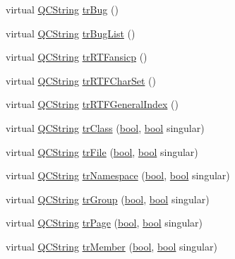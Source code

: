 \begin{DoxyCompactItemize}
\item 
virtual \hyperlink{class_q_c_string}{Q\+C\+String} \hyperlink{class_translator_arabic_aacd74b628e36340a3b593435bc295529}{tr\+Bug} ()
\item 
virtual \hyperlink{class_q_c_string}{Q\+C\+String} \hyperlink{class_translator_arabic_a1a0f397c655873ff36805aef2a2f4282}{tr\+Bug\+List} ()
\item 
virtual \hyperlink{class_q_c_string}{Q\+C\+String} \hyperlink{class_translator_arabic_aa85b5114f22f96945211a76b143bc067}{tr\+R\+T\+Fansicp} ()
\item 
virtual \hyperlink{class_q_c_string}{Q\+C\+String} \hyperlink{class_translator_arabic_a2d31627bc9d5ab47da2d88e210a17b32}{tr\+R\+T\+F\+Char\+Set} ()
\item 
virtual \hyperlink{class_q_c_string}{Q\+C\+String} \hyperlink{class_translator_arabic_ab7697710fd8381e9b2439afb69fb1894}{tr\+R\+T\+F\+General\+Index} ()
\item 
virtual \hyperlink{class_q_c_string}{Q\+C\+String} \hyperlink{class_translator_arabic_af60f81882a17979949235c2b0ddf0691}{tr\+Class} (\hyperlink{qglobal_8h_a1062901a7428fdd9c7f180f5e01ea056}{bool}, \hyperlink{qglobal_8h_a1062901a7428fdd9c7f180f5e01ea056}{bool} singular)
\item 
virtual \hyperlink{class_q_c_string}{Q\+C\+String} \hyperlink{class_translator_arabic_aca6144fb44b8cfcf13db8c5bc91a4557}{tr\+File} (\hyperlink{qglobal_8h_a1062901a7428fdd9c7f180f5e01ea056}{bool}, \hyperlink{qglobal_8h_a1062901a7428fdd9c7f180f5e01ea056}{bool} singular)
\item 
virtual \hyperlink{class_q_c_string}{Q\+C\+String} \hyperlink{class_translator_arabic_a1f3b25edf7d4e0bb62949b2c23bf6bbe}{tr\+Namespace} (\hyperlink{qglobal_8h_a1062901a7428fdd9c7f180f5e01ea056}{bool}, \hyperlink{qglobal_8h_a1062901a7428fdd9c7f180f5e01ea056}{bool} singular)
\item 
virtual \hyperlink{class_q_c_string}{Q\+C\+String} \hyperlink{class_translator_arabic_a0e846c5779242ca184c0eba9e939be4c}{tr\+Group} (\hyperlink{qglobal_8h_a1062901a7428fdd9c7f180f5e01ea056}{bool}, \hyperlink{qglobal_8h_a1062901a7428fdd9c7f180f5e01ea056}{bool} singular)
\item 
virtual \hyperlink{class_q_c_string}{Q\+C\+String} \hyperlink{class_translator_arabic_a01335b7b68d621778e021feffe7ad1cc}{tr\+Page} (\hyperlink{qglobal_8h_a1062901a7428fdd9c7f180f5e01ea056}{bool}, \hyperlink{qglobal_8h_a1062901a7428fdd9c7f180f5e01ea056}{bool} singular)
\item 
virtual \hyperlink{class_q_c_string}{Q\+C\+String} \hyperlink{class_translator_arabic_a079b9fecf2ac416addd85d6498290628}{tr\+Member} (\hyperlink{qglobal_8h_a1062901a7428fdd9c7f180f5e01ea056}{bool}, \hyperlink{qglobal_8h_a1062901a7428fdd9c7f180f5e01ea056}{bool} singular)

\end{DoxyCompactItemize}
